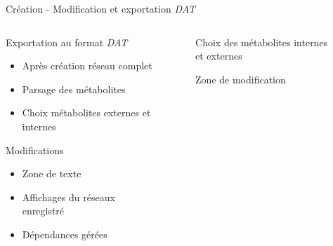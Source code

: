 \documentclass{beamer}
\begin{document}
\begin{frame}{\textcolor{bleu2}{\hspace{1cm}Création - Modification et exportation \emph{DAT}}}
\small
	\begin{columns}
		\begin{column}[l]{4cm}
			\begin{block}{\hspace{0.2cm}Exportation au format \emph{DAT}}
				\begin{itemize}
					\item Après création réseau complet
					\item Parsage des métabolites
					\item Choix métabolites externes et internes
				\end{itemize}
			\end{block}
			\begin{block}{\hspace{0.2cm}Modifications}
				\begin{itemize}
					\item Zone de texte
					\item Affichages du réseaux enregistré
					\item Dépendances gérées
				\end{itemize}
			\end{block}
		\end{column}
		\begin{column}[r]{6cm}
			\begin{figure}[!ht]
				\begin{center}
					\caption{Choix des métabolites internes et externes}
  				\end{center}
			\end{figure}
			\begin{figure}[!ht]
				\begin{center}
					\caption{Zone de modification}
  				\end{center}
			\end{figure}
		\end{column}
	\end{columns}
\end{frame}
\end{document}
